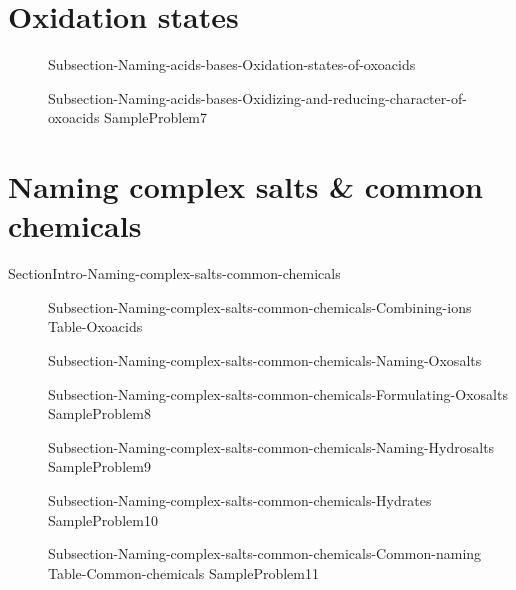 \documentclass[main.tex]{subfiles}
\newcommand\chapterlabel{Ch-naming}\setcounter{figurenewcounter}{0}\setcounter{tablenewcounter}{0}\setcounter{formulanewcounter}{0}\chapterpicture{../{\chapterlabel}/figure1}\chapterpicturelabel{Pixnio}
\begin{document}
\section{Oxidation states}
\sloppy \begin{description}
\item[] {Subsection-Naming-acids-bases-Oxidation-states-of-oxoacids}
\item[] {Subsection-Naming-acids-bases-Oxidizing-and-reducing-character-of-oxoacids}
{SampleProblem7}
\end{description}

\section{Naming complex salts  \& common chemicals}
{SectionIntro-Naming-complex-salts-common-chemicals}
\sloppy \begin{description}
\item[] {Subsection-Naming-complex-salts-common-chemicals-Combining-ions}
 {Table-Oxoacids}
\item[]{Subsection-Naming-complex-salts-common-chemicals-Naming-Oxosalts}
\item[] {Subsection-Naming-complex-salts-common-chemicals-Formulating-Oxosalts}
{SampleProblem8}
\item[] {Subsection-Naming-complex-salts-common-chemicals-Naming-Hydrosalts}
{SampleProblem9}
\item[] {Subsection-Naming-complex-salts-common-chemicals-Hydrates}
{SampleProblem10}
\item[] {Subsection-Naming-complex-salts-common-chemicals-Common-naming}
{Table-Common-chemicals}	
 {SampleProblem11}
\end{description}
\end{document}
